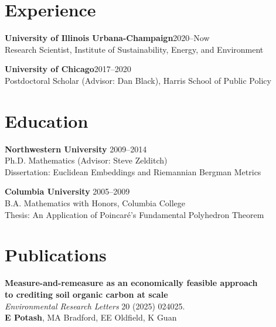 \documentclass[margin,line]{resume}
\begin{document}
\address{eric@k2co3.net / \href{http://www.k2co3.net}{k2co3.net} / \href{https://github.com/potash}{github.com/potash}}
\begin{resume}
\section{\mysidestyle Experience}

	{\bf University of Illinois Urbana-Champaign}\hfill{2020--Now}\\
	Research Scientist, Institute of Sustainability, Energy, and Environment

	{\bf University of Chicago}\hfill{2017--2020}\\
	Postdoctoral Scholar (Advisor: Dan Black), Harris School of Public Policy

    \section{\mysidestyle Education}
	
	{\bf Northwestern University} \hfill {2009--2014} \\%
	Ph.D. Mathematics (Advisor: Steve Zelditch) \\
	Dissertation: Euclidean Embeddings and Riemannian Bergman Metrics

	{\bf Columbia University} \hfill {2005--2009} \\%
    B.A. Mathematics with Honors, Columbia College \\
	Thesis: An Application of Poincar\'e's Fundamental Polyhedron Theorem

	
	\section{\mysidestyle Publications}
        
        {\bf Measure-and-remeasure as an economically feasible approach\\to crediting soil organic carbon at scale}\\
        \textit{Environmental Research Letters} 20 (2025) 024025.\\
        \textbf{E Potash}, MA Bradford, EE Oldfield, K Guan


\end{resume}
\end{document}
